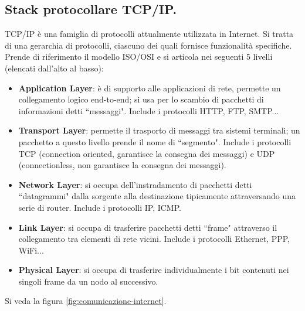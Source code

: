 \documentclass[11pt, italian, openany]{book}
\begin{document}
\begin{sloppypar}
\subsection{Stack protocollare TCP/IP.}
TCP/IP \`e una famiglia di protocolli attualmente utilizzata in Internet. Si tratta di una gerarchia di protocolli, ciascuno dei quali fornisce
funzionalit\`a specifiche. Prende di riferimento il modello ISO/OSI e si articola nei seguenti 5 livelli (elencati dall'alto al basso):
\begin{itemize}[topsep=0pt, itemsep=0pt, parsep=0pt]
	\item \textbf{Application Layer}: \`e di supporto alle applicazioni di rete, permette un collegamento logico end-to-end; si usa per lo scambio di
	pacchetti di informazioni detti ``messaggi". Include i protocolli HTTP, FTP, SMTP...
	\item \textbf{Transport Layer}: permette il trasporto di messaggi tra sistemi terminali; un pacchetto a questo livello prende il nome di ``segmento".
	Include i protocolli TCP (connection oriented, garantisce la consegna dei messaggi) e UDP (connectionless, non garantisce la consegna dei messaggi).
	\item \textbf{Network Layer}: si occupa dell'instradamento di pacchetti detti ``datagrammi" dalla sorgente alla destinazione tipicamente attraversando
	una serie di router. Include i protocolli IP, ICMP.
	\item \textbf{Link Layer}: si occupa di trasferire pacchetti detti ``frame" attraverso il collegamento tra elementi di rete vicini. Include i protocolli
	Ethernet, PPP, WiFi...
	\item \textbf{Physical Layer}: si occupa di trasferire individualmente i bit contenuti nei singoli frame da un nodo al successivo.
\end{itemize}

Si veda la figura \ref{fig:comunicazione-internet}.


\end{sloppypar}
\end{document}
